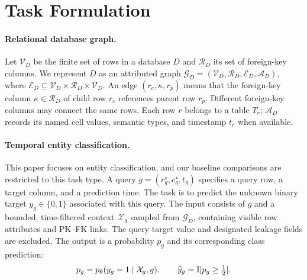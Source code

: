 \section{Task Formulation}
\label{sec:task}

\paragraph{Relational database graph.}
Let $\mathcal V_D$ be the finite set of rows in a database $D$ and $\mathcal R_D$ its set of foreign-key columns. We represent $D$ as an attributed graph $\mathcal G_D=(\mathcal V_D,\mathcal R_D,\mathcal E_D,\mathcal A_D)$, where $\mathcal E_D\subseteq\mathcal V_D\times\mathcal R_D\times\mathcal V_D$. An edge $(r_c,\kappa,r_p)$ means that the foreign-key column $\kappa\in\mathcal R_D$ of child row $r_c$ references parent row $r_p$.  Different foreign-key columns may connect the same rows.  Each row $r$ belongs to a table $T_r$; $\mathcal A_D$ records its named cell values, semantic types, and timestamp $t_r$ when available.

\paragraph{Temporal entity classification.}
This paper focuses on entity classification, and our baseline comparisons
are restricted to this task type. A query $g=(r_g^\star,c_g^\star,t_g)$ specifies a query row, a target column, and a prediction time. The task is to predict the unknown binary target $y_g\in\{0,1\}$ associated with this query. The input consists of $g$ and a bounded, time-filtered context $\mathcal X_g$ sampled from $\mathcal G_D$, containing visible row attributes and PK--FK links. The query target value and designated leakage fields are excluded. The output is a probability $p_g$ and its corresponding class prediction:
\begin{equation}
 p_g=p_\theta(y_g=1\mid\mathcal X_g,g),
 \qquad \widehat y_g=\mathbb{I}[p_g\geq\tfrac12].
 \label{eq:task}
\end{equation}



